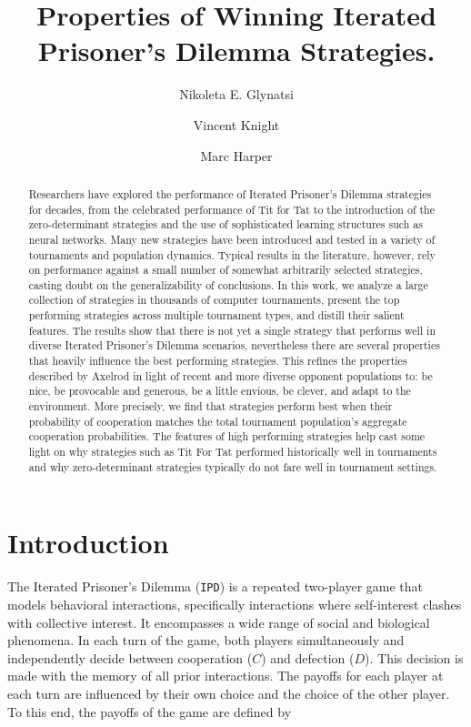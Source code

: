 \documentclass{article}
\title{Properties of Winning Iterated Prisoner's Dilemma Strategies.}
\author[1, 2]{Nikoleta E. Glynatsi}
\author[2, $\dagger$]{Vincent Knight}
\author[3, $\dagger$]{Marc Harper}
\affil[1]{Max Planck Institute for Evolutionary Biology, Research Group Dynamics of Social
Behavior, Germany}
\affil[2]{Cardiff University, School of Mathematics, UK}
\affil[3]{Google Inc., Mountain View, CA, USA}
\affil[$\dagger$]{V.K. and M.H. contributed equally to this work.}
\date{}
\newcommand{\numberofstrategies}{}
\def\IPD{\texttt{IPD}}
\begin{document}
\maketitle

\begin{abstract}
Researchers have explored the performance of Iterated Prisoner's Dilemma strategies
for decades, from the celebrated performance of Tit for Tat to the
introduction of the zero-determinant strategies and the use of sophisticated learning
structures such as neural networks. Many new strategies have been introduced and tested
in a variety of tournaments and population dynamics. Typical results in the literature,
however, rely on performance against a small number of somewhat arbitrarily selected
strategies, casting doubt on the generalizability
of conclusions. In this work, we analyze a large collection of \numberofstrategies
strategies in thousands of computer tournaments, present the top performing strategies across multiple
tournament types, and distill their salient features.
The results show that there is not yet a single
strategy that performs well in diverse Iterated Prisoner's Dilemma scenarios,
nevertheless there are several properties that heavily influence the best performing
strategies. This refines the properties described by Axelrod in light of
recent and more diverse opponent populations to: be nice, be provocable and generous,
be a little envious, be clever, and adapt to the environment. More precisely,
we find that strategies perform best when their probability of cooperation
matches the total tournament population's aggregate cooperation probabilities.
The features of high performing strategies help cast some light on why
strategies such as Tit For Tat performed historically well in tournaments and
why zero-determinant strategies typically do not fare well in tournament
settings.
\end{abstract}

\section{Introduction}

The Iterated Prisoner's Dilemma (\IPD) is a repeated two-player game that models
behavioral interactions, specifically interactions where self-interest clashes
with collective interest. It encompasses a wide range of social and
biological phenomena. In each turn of the game, both players simultaneously
and independently decide between cooperation (\(C\)) and defection (\(D\)). This
decision is made with the memory of all prior interactions. The payoffs for each
player at each turn are influenced by their own choice and the choice of the
other player. To this end, the payoffs of the game are defined by
\end{document}
